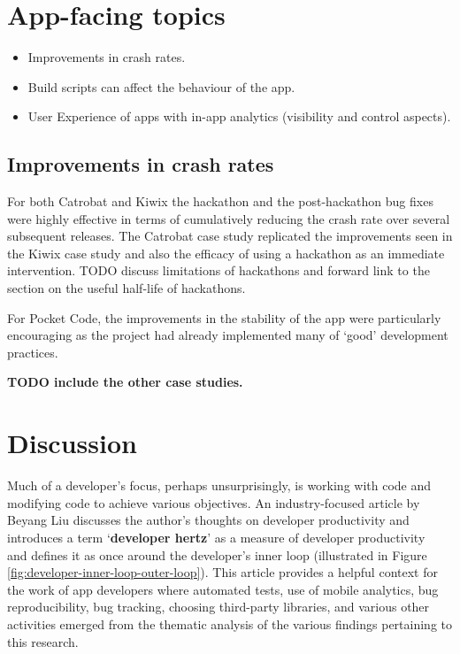 \section{App-facing topics}

\begin{itemize}
    \itemsep0em
    \item Improvements in crash rates.
    \item Build scripts can affect the behaviour of the app.
    \item User Experience of apps with in-app analytics (visibility and control aspects).
\end{itemize}

\subsection{Improvements in crash rates}
For both Catrobat and Kiwix the hackathon and the post-hackathon bug fixes were highly effective in terms of cumulatively reducing the crash rate over several subsequent releases. %
The Catrobat case study replicated the improvements seen in the Kiwix case study and also the efficacy of using a hackathon as an immediate intervention. TODO discuss limitations of hackathons and forward link to the section on the useful half-life of hackathons. 


For Pocket Code, the improvements in the stability of the app were particularly encouraging as the project had already implemented many of `good' development practices.


\textbf{TODO include the other case studies.}

\section{Discussion}\label{apps-and-artefacts-discussion-section}
Much of a developer's focus, perhaps unsurprisingly, is working with code and modifying code to achieve various objectives. An industry-focused article by Beyang Liu discusses the author's thoughts on developer productivity and introduces a term `\textbf{developer hertz}' as a measure of developer productivity~\citep{liu2022_a_devs_thoughts_onDeveloper_productivity} and defines it as once around the developer's inner loop (illustrated in Figure \ref{fig:developer-inner-loop-outer-loop}). This article provides a helpful context for the work of app developers where automated tests, use of mobile analytics, bug reproducibility, bug tracking, choosing third-party libraries, and various other activities emerged from the thematic analysis of the various findings pertaining to this research.

